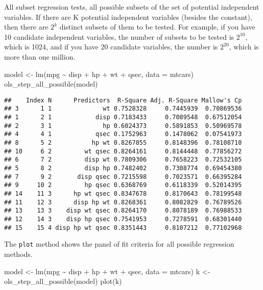 \documentclass[
]{article}
\newenvironment{Shaded}{\begin{snugshade}}{\end{snugshade}}
\newcommand{\AttributeTok}[1]{\textcolor[rgb]{0.77,0.63,0.00}{#1}}
\newcommand{\FunctionTok}[1]{\textcolor[rgb]{0.00,0.00,0.00}{#1}}
\newcommand{\NormalTok}[1]{#1}
\newcommand{\OtherTok}[1]{\textcolor[rgb]{0.56,0.35,0.01}{#1}}
\newcommand{\SpecialCharTok}[1]{\textcolor[rgb]{0.00,0.00,0.00}{#1}}
\begin{document}
All subset regression tests, all possible subsets of the set of
potential independent variables. If there are K potential independent
variables (besides the constant), then there are \(2^{k}\) distinct
subsets of them to be tested. For example, if you have 10 candidate
independent variables, the number of subsets to be tested is \(2^{10}\),
which is 1024, and if you have 20 candidate variables, the number is
\(2^{20}\), which is more than one million.

\begin{Shaded}
\begin{Highlighting}[]
\NormalTok{model }\OtherTok{\textless{}{-}} \FunctionTok{lm}\NormalTok{(mpg }\SpecialCharTok{\textasciitilde{}}\NormalTok{ disp }\SpecialCharTok{+}\NormalTok{ hp }\SpecialCharTok{+}\NormalTok{ wt }\SpecialCharTok{+}\NormalTok{ qsec, }\AttributeTok{data =}\NormalTok{ mtcars)}
\FunctionTok{ols\_step\_all\_possible}\NormalTok{(model)}
\end{Highlighting}
\end{Shaded}

\begin{verbatim}
##    Index N      Predictors  R-Square Adj. R-Square Mallow's Cp
## 3      1 1              wt 0.7528328     0.7445939  0.70869536
## 1      2 1            disp 0.7183433     0.7089548  0.67512054
## 2      3 1              hp 0.6024373     0.5891853  0.50969578
## 4      4 1            qsec 0.1752963     0.1478062  0.07541973
## 8      5 2           hp wt 0.8267855     0.8148396  0.78108710
## 10     6 2         wt qsec 0.8264161     0.8144448  0.77856272
## 6      7 2         disp wt 0.7809306     0.7658223  0.72532105
## 5      8 2         disp hp 0.7482402     0.7308774  0.69454380
## 7      9 2       disp qsec 0.7215598     0.7023571  0.66395284
## 9     10 2         hp qsec 0.6368769     0.6118339  0.52014395
## 14    11 3      hp wt qsec 0.8347678     0.8170643  0.78199548
## 11    12 3      disp hp wt 0.8268361     0.8082829  0.76789526
## 13    13 3    disp wt qsec 0.8264170     0.8078189  0.76988533
## 12    14 3    disp hp qsec 0.7541953     0.7278591  0.68301440
## 15    15 4 disp hp wt qsec 0.8351443     0.8107212  0.77102968
\end{verbatim}

The \texttt{plot} method shows the panel of fit criteria for all
possible regression methods.

\begin{Shaded}
\begin{Highlighting}[]
\NormalTok{model }\OtherTok{\textless{}{-}} \FunctionTok{lm}\NormalTok{(mpg }\SpecialCharTok{\textasciitilde{}}\NormalTok{ disp }\SpecialCharTok{+}\NormalTok{ hp }\SpecialCharTok{+}\NormalTok{ wt }\SpecialCharTok{+}\NormalTok{ qsec, }\AttributeTok{data =}\NormalTok{ mtcars)}
\NormalTok{k }\OtherTok{\textless{}{-}} \FunctionTok{ols\_step\_all\_possible}\NormalTok{(model)}
\FunctionTok{plot}\NormalTok{(k)}
\end{Highlighting}
\end{Shaded}
\end{document}
